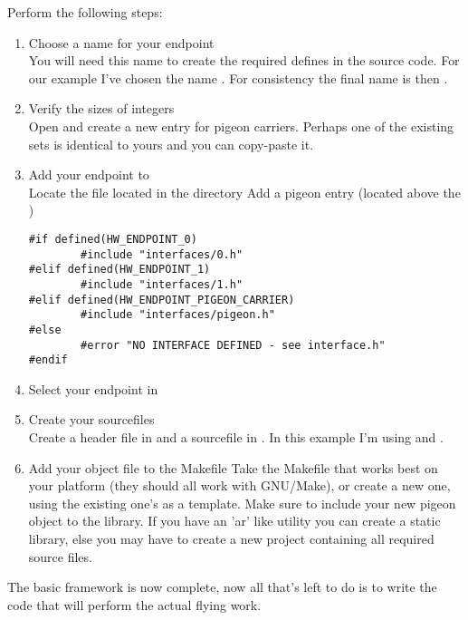 Perform the following steps:
\begin{enumerate}

	\item Choose a name for your endpoint\\
	You will need this name to create the required defines in the source code.
	For our example I've chosen the name .
	For consistency the final name is then .

	\item Verify the sizes of integers\\
	Open  and create a new entry for pigeon carriers. Perhaps
	one of the existing sets is identical to yours and you can copy-paste it.

	\item Add your endpoint to \\
	Locate the file  located in the directory 
	Add a pigeon entry (located above the )
\begin{lstlisting}
#if defined(HW_ENDPOINT_0)
   		#include "interfaces/0.h"
#elif defined(HW_ENDPOINT_1)
        #include "interfaces/1.h"
#elif defined(HW_ENDPOINT_PIGEON_CARRIER)
        #include "interfaces/pigeon.h"
#else
        #error "NO INTERFACE DEFINED - see interface.h"
#endif
\end{lstlisting}

	\item Select your endpoint in 

	\item Create your sourcefiles\\
	Create a header file in  and a sourcefile in .
	In this example I'm using  and .

	\item Add your object file to the Makefile
	Take the Makefile that works best on your platform (they should all work with
	GNU/Make), or create a new one, using the existing one's as a template.
	Make sure to include your new pigeon object to the library.
	If you have an 'ar' like utility you can create a static library, else you may
	have to create a new project containing all required source files.

\end{enumerate}

The basic framework is now complete, now all that's left to do is to write the code
that will perform the actual flying work.

